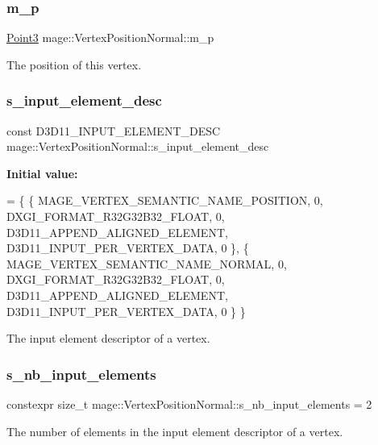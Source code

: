 \subsubsection{\texorpdfstring{m\+\_\+p}{m\_p}}
{\footnotesize\ttfamily \hyperlink{structmage_1_1_point3}{Point3} mage\+::\+Vertex\+Position\+Normal\+::m\+\_\+p}

The position of this vertex. \hypertarget{structmage_1_1_vertex_position_normal_aa597c602ce172e523bece0e75d157081}{}\label{structmage_1_1_vertex_position_normal_aa597c602ce172e523bece0e75d157081} 
\subsubsection{\texorpdfstring{s\+\_\+input\+\_\+element\+\_\+desc}{s\_input\_element\_desc}}
{\footnotesize\ttfamily const D3\+D11\+\_\+\+I\+N\+P\+U\+T\+\_\+\+E\+L\+E\+M\+E\+N\+T\+\_\+\+D\+E\+SC mage\+::\+Vertex\+Position\+Normal\+::s\+\_\+input\+\_\+element\+\_\+desc\hspace{0.3cm}{\ttfamily [static]}}

{\bfseries Initial value\+:}
\begin{DoxyCode}
= \{
        \{ MAGE\_VERTEX\_SEMANTIC\_NAME\_POSITION, 0, DXGI\_FORMAT\_R32G32B32\_FLOAT,    0, 
      D3D11\_APPEND\_ALIGNED\_ELEMENT, D3D11\_INPUT\_PER\_VERTEX\_DATA, 0 \},
        \{ MAGE\_VERTEX\_SEMANTIC\_NAME\_NORMAL,   0, DXGI\_FORMAT\_R32G32B32\_FLOAT,    0, 
      D3D11\_APPEND\_ALIGNED\_ELEMENT, D3D11\_INPUT\_PER\_VERTEX\_DATA, 0 \}
    \}
\end{DoxyCode}
The input element descriptor of a vertex. \hypertarget{structmage_1_1_vertex_position_normal_a0c92f3814b7ce5f1f861498a42926374}{}\label{structmage_1_1_vertex_position_normal_a0c92f3814b7ce5f1f861498a42926374} 
\subsubsection{\texorpdfstring{s\+\_\+nb\+\_\+input\+\_\+elements}{s\_nb\_input\_elements}}
{\footnotesize\ttfamily constexpr size\+\_\+t mage\+::\+Vertex\+Position\+Normal\+::s\+\_\+nb\+\_\+input\+\_\+elements = 2\hspace{0.3cm}{\ttfamily [static]}}

The number of elements in the input element descriptor of a vertex. 